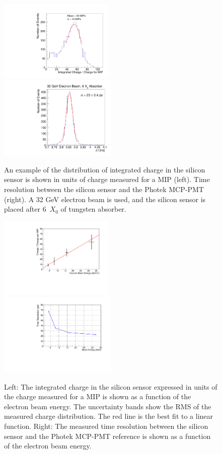 \documentclass[12pt]{article}
\begin{document}
{\begin{figure}[htbp] 
\centering
\includegraphics[width=0.49\textwidth]{plots/Electron_6X0_32GeV_chargeMIP.pdf} 
\includegraphics[width=0.50\textwidth]{plots/deltaT_32GeV_6X0.pdf} 
\caption{ An example of the distribution of integrated charge in the silicon
sensor is shown in units of charge measured for a MIP (left). Time
resolution between the silicon sensor and the Photek MCP-PMT (right). A 32 GeV
electron beam is used, and the silicon sensor is placed after 6~$X_0$ of tungsten absorber.} 
\label{fig:ChargeDistributionExample}
\end{figure}

\begin{figure}[htbp] 
\centering
\includegraphics[width=0.49\textwidth]{plots/MIPVsEnergyAt6X0.pdf} 
\includegraphics[width=0.50\textwidth]{plots/SigmaT_vs_BeamEnergy_lin30Stamp.pdf} 
\caption{Left: The integrated charge in the silicon sensor expressed in units of the
charge measured for a MIP is shown as a function of the electron beam
energy. The uncertainty bands show the RMS of the measured charge distribution.
The red line is the best fit to a linear function. Right: The measured
time resolution between the silicon sensor and the Photek MCP-PMT reference is
shown as a function of the electron beam energy. } 
\label{fig:MIPVsEnergy} 
\end{figure} 

}
\end{document}
